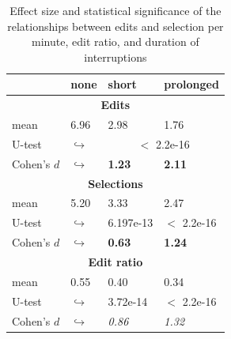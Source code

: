 \documentclass[times]{smrauth}
\begin{document}



\begin{table}[ht!]
\tiny
\renewcommand{\arraystretch}{1.3}
\caption{Effect size and statistical significance of the relationships between edits and selection per minute, edit ratio, and duration of interruptions} %
\label{tbl:p_value2}
\centering
\begin{tabular}{l | p{0.7cm} | p{1.9cm} | p{1.9cm} } 
   & none & short &  prolonged  \\  
  \hline
  \multicolumn{4}{c}{\textbf{Edits}} \\
  \hline
  mean & 6.96 &	2.98 & 1.76 \\ 
   \cline{3-4} 
  U-test & $\hookrightarrow$ & \multicolumn{2}{c}{$<$ 2.2e-16}  \\

  \cline{3-4} 
  Cohen's $d$ & $\hookrightarrow$	& \textbf{1.23} & \textbf{2.11}   \\
  \hline
  
  
  \multicolumn{4}{c}{\textbf{Selections}} \\
  \hline 
  mean & 5.20 &	3.33 & 2.47 \\ 
   \cline{3-4} 
  U-test & $\hookrightarrow$ & 6.197e-13 & $<$ 2.2e-16 \\
  
  \cline{3-4} 
  Cohen's $d$ & $\hookrightarrow$	& \textbf{0.63} & \textbf{1.24}  \\  
  \hline
  \multicolumn{4}{c}{\textbf{Edit ratio}} \\
  \hline 
  mean & 0.55 & 0.40 & 0.34\\ 
   \cline{3-4} 
  U-test & $\hookrightarrow$ & 3.72e-14 & $<$ 2.2e-16  \\
  \cline{3-4} 
  Cohen's $d$ & $\hookrightarrow$ & \textit{0.86} & \textit{1.32}\\
\hline

\end{tabular}
\end{table}
\end{document}
